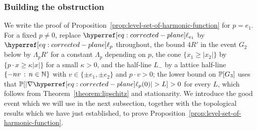 \documentclass[12pt]{amsart}
\numberwithin{equation}{section}
\begin{document}
	
	
	\subsubsection{Building the obstruction} \label{subsubsec:building-the-obstruction}
	We write the proof of Proposition~\ref{prop:level-set-of-harmonic-function} for $p = e_1$. For a fixed $p \neq 0$, replace $\ellp{e_1}$ by $\ellp{p}$ throughout, the bound $4 R'$ in the event $G_2$ below by $\Lambda_p R'$ for a constant $\Lambda_p$ depending on $p$, the cone $\{ x_1 \geq |x_2| \}$ by $\{ p \cdot x \geq \kappa |x| \}$ for a small $\kappa > 0$, and the half-line $L_-$ by a lattice half-line $\{ - n v \, : \, n \in \N \}$ with $v \in \{ \pm e_1 , \pm e_2 \}$ and $p \cdot v > 0$; the lower bound on $\P[G_3]$ uses that $\P[ |\nabla \ellp{p}(0)| > L ] > 0$ for every $L$, which follows from Theorem~\ref{theorem:lipschitz} and stationarity. We introduce the good event which we will use in the next subsection, together with the 
	topological results which we have just established, to prove Proposition~\ref{prop:level-set-of-harmonic-function}.
	
\end{document}
